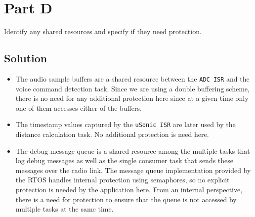 \section*{Part D}

Identify any shared resources and specify if they need protection.

\subsection*{Solution}

\begin{itemize}
    \item
          The audio sample buffers are a shared resource between the \texttt{ADC ISR} and the voice command detection task.
          Since we are using a double buffering scheme, there is no need for any additional protection here since at a given time only one of them accesses either of the buffers.
    \item
          The timestamp values captured by the \texttt{uSonic ISR} are later used by the distance calculation task.
          No additional protection is need here.
    \item
          The debug message queue is a shared resource among the multiple tasks that log debug messages as well as the single consumer task that sends these messages over the radio link.
          The message queue implementation provided by the RTOS handles internal protection using semaphores, so no explicit protection is needed by the application here.
          From an internal perspective, there is a need for protection to ensure that the queue is not accessed by multiple tasks at the same time.
\end{itemize}
